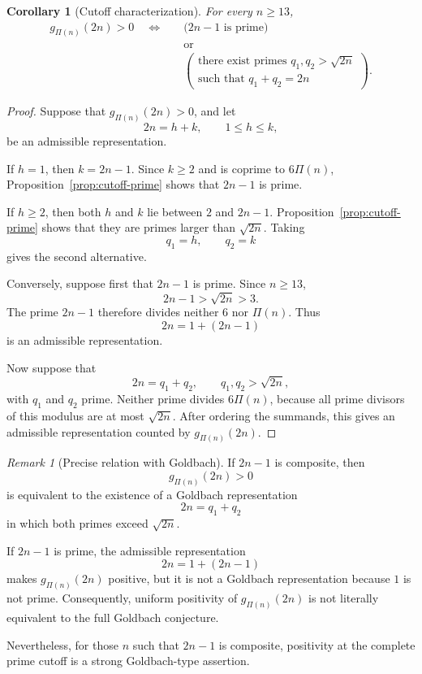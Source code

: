 \documentclass[12pt]{article}
\numberwithin{equation}{section}
\newtheorem{corollary}[theorem]{Corollary}
\theoremstyle{definition}
\theoremstyle{remark}
\newtheorem{remark}[theorem]{Remark}
\begin{document}
\begin{corollary}[Cutoff characterization]
\label{cor:cutoff-equivalence}
For every $n\geq13$,
\begin{equation}
\label{eq:cutoff-equivalence}
\begin{aligned}
g_{\Pi(n)}(2n)>0
\quad\Longleftrightarrow\quad
&
\bigl(2n-1\text{ is prime}\bigr)
\\
&\text{or}
\\[-2pt]
&
\left(
\begin{array}{c}
\text{there exist primes }
q_1,q_2>\sqrt{2n}\\
\text{such that }q_1+q_2=2n
\end{array}
\right).
\end{aligned}
\end{equation}
\end{corollary}

\begin{proof}
Suppose that $g_{\Pi(n)}(2n)>0$, and let
\[
2n=h+k,
\qquad
1\leq h\leq k,
\]
be an admissible representation.

If $h=1$, then $k=2n-1$. Since $k\geq2$ and is coprime to
$6\Pi(n)$, Proposition~\ref{prop:cutoff-prime} shows that
$2n-1$ is prime.

If $h\geq2$, then both $h$ and $k$ lie between $2$ and
$2n-1$. Proposition~\ref{prop:cutoff-prime} shows that they
are primes larger than $\sqrt{2n}$. Taking
\[
q_1=h,
\qquad
q_2=k
\]
gives the second alternative.

Conversely, suppose first that $2n-1$ is prime. Since
$n\geq13$,
\[
2n-1>\sqrt{2n}>3.
\]
The prime $2n-1$ therefore divides neither $6$ nor $\Pi(n)$.
Thus
\[
2n=1+(2n-1)
\]
is an admissible representation.

Now suppose that
\[
2n=q_1+q_2,
\qquad
q_1,q_2>\sqrt{2n},
\]
with $q_1$ and $q_2$ prime. Neither prime divides
$6\Pi(n)$, because all prime divisors of this modulus are at
most $\sqrt{2n}$. After ordering the summands, this gives an
admissible representation counted by $g_{\Pi(n)}(2n)$.
\end{proof}

\begin{remark}[Precise relation with Goldbach]
If $2n-1$ is composite, then
\[
g_{\Pi(n)}(2n)>0
\]
is equivalent to the existence of a Goldbach representation
\[
2n=q_1+q_2
\]
in which both primes exceed $\sqrt{2n}$.

If $2n-1$ is prime, the admissible representation
\[
2n=1+(2n-1)
\]
makes $g_{\Pi(n)}(2n)$ positive, but it is not a Goldbach
representation because $1$ is not prime. Consequently, uniform
positivity of $g_{\Pi(n)}(2n)$ is not literally equivalent to
the full Goldbach conjecture.

Nevertheless, for those $n$ such that $2n-1$ is composite,
positivity at the complete prime cutoff is a strong
Goldbach-type assertion.
\end{remark}
\end{document}
